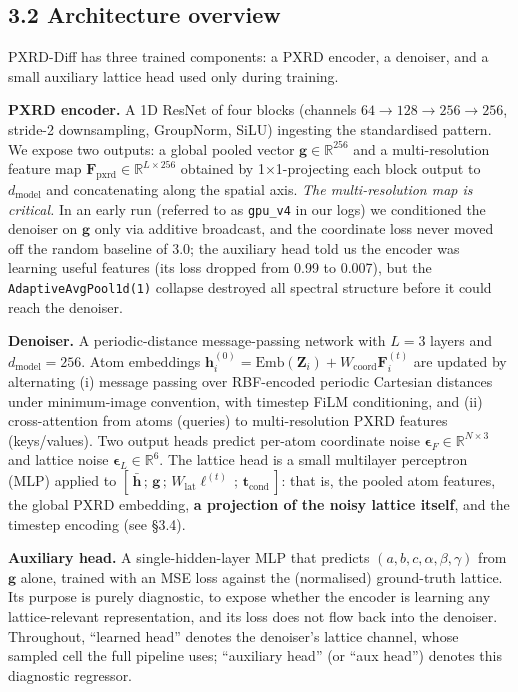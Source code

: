 \documentclass[
  11pt,
]{article}
\begin{document}
\subsection{3.2 Architecture overview}\label{architecture-overview}

PXRD-Diff has three trained components: a PXRD encoder, a denoiser, and
a small auxiliary lattice head used only during training.

\textbf{PXRD encoder.} A 1D ResNet of four blocks (channels
\(64 \to 128 \to 256 \to 256\), stride-2 downsampling, GroupNorm, SiLU)
ingesting the standardised pattern. We expose two outputs: a global
pooled vector \(\mathbf{g} \in \mathbb{R}^{256}\) and a multi-resolution
feature map \(\mathbf{F}_{\text{pxrd}} \in \mathbb{R}^{L \times 256}\)
obtained by 1×1-projecting each block output to \(d_\text{model}\) and
concatenating along the spatial axis. \emph{The multi-resolution map is
critical.} In an early run (referred to as \texttt{gpu\_v4} in our logs)
we conditioned the denoiser on \(\mathbf{g}\) only via additive
broadcast, and the coordinate loss never moved off the random baseline
of 3.0; the auxiliary head told us the encoder was learning useful
features (its loss dropped from 0.99 to 0.007), but the
\texttt{AdaptiveAvgPool1d(1)} collapse destroyed all spectral structure
before it could reach the denoiser.

\textbf{Denoiser.} A periodic-distance message-passing network with
\(L = 3\) layers and \(d_\text{model} = 256\). Atom embeddings
\(\mathbf{h}_i^{(0)} = \text{Emb}(\mathbf{Z}_i) + W_\text{coord}\mathbf{F}_i^{(t)}\)
are updated by alternating (i) message passing over RBF-encoded periodic
Cartesian distances under minimum-image convention, with timestep FiLM
conditioning, and (ii) cross-attention from atoms (queries) to
multi-resolution PXRD features (keys/values). Two output heads predict
per-atom coordinate noise
\(\boldsymbol{\epsilon}_F \in \mathbb{R}^{N \times 3}\) and lattice
noise \(\boldsymbol{\epsilon}_L \in \mathbb{R}^6\). The lattice head is
a small multilayer perceptron (MLP) applied to
\([\,\bar{\mathbf{h}}\,;\, \mathbf{g}\,;\, W_\text{lat}\boldsymbol{\ell}^{(t)}\,;\, \mathbf{t}_\text{cond}\,]\):
that is, the pooled atom features, the global PXRD embedding, \textbf{a
projection of the noisy lattice itself}, and the timestep encoding (see
§3.4).

\textbf{Auxiliary head.} A single-hidden-layer MLP that predicts
\((a,b,c,\alpha,\beta,\gamma)\) from \(\mathbf{g}\) alone, trained with
an MSE loss against the (normalised) ground-truth lattice. Its purpose
is purely diagnostic, to expose whether the encoder is learning any
lattice-relevant representation, and its loss does not flow back into
the denoiser. Throughout, ``learned head'' denotes the denoiser's
lattice channel, whose sampled cell the full pipeline uses; ``auxiliary
head'' (or ``aux head'') denotes this diagnostic regressor.
\end{document}
